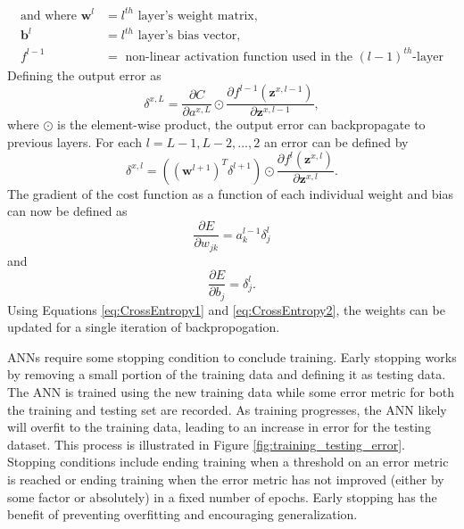 \begin{align*}
  \text{and where } \boldsymbol{w}^{l} &= l^{th} \text{ layer's weight matrix,} \\
  \boldsymbol{b}^{l} &= l^{th} \text{ layer's bias vector,} \\
  f^{l-1} &= \text{ non-linear activation function used in the $(l-1)^{th}$-layer}
\end{align*}
%
Defining the output error as 
%
\begin{equation} \label{eq:CrossEntropy}
\delta^{x,L} = \frac{\partial C}{\partial a^{x,L}} \odot \frac{\partial f^{l-1}(\boldsymbol{z}^{x,l-1}) }{\partial \boldsymbol{z}^{x,l-1}}, 
\end{equation}
%
where $\odot$ is the element-wise product, the output error can backpropagate to previous layers. For each $l=L-1,L-2,...,2$ an error can be defined by
%
\begin{equation} \label{eq:CrossEntropy}
\delta^{x,l} = ((\boldsymbol{w}^{l+1})^T \delta^{l+1}) \odot \frac{\partial f^{l}(\boldsymbol{z}^{x,l}) }{\partial \boldsymbol{z}^{x,l}}.
\end{equation}
%
The gradient of the cost function as a function of each individual weight and bias can now be defined as 
%
\begin{equation} \label{eq:CrossEntropy1}
\frac{\partial E}{\partial w_{jk}} = a^{l-1}_k \delta^l_j
\end{equation}
%
and 
%
\begin{equation} \label{eq:CrossEntropy2}
\frac{\partial E}{\partial b_j} = \delta^l_j.
\end{equation}
%
Using Equations \ref{eq:CrossEntropy1} and \ref{eq:CrossEntropy2}, the weights can be updated for a single iteration of backpropogation. 




ANNs require some stopping condition to conclude training. Early stopping works by removing a small portion of the training data and defining it as testing data. The ANN is trained using the new training data while some error metric for both the training and testing set are recorded. As training progresses, the ANN likely will overfit to the training data, leading to an increase in error for the testing dataset. This process is illustrated in Figure \ref{fig:training_testing_error}. Stopping conditions include ending training when a threshold on an error metric is reached or ending training when the error metric has not improved (either by some factor or absolutely) in a fixed number of epochs. Early stopping has the benefit of preventing overfitting and encouraging generalization.


